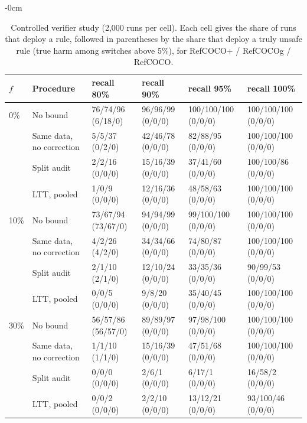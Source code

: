 \begin{table}[H]
\begin{adjustwidth}{-\extralength}{0cm}
\caption{Controlled verifier study (2,000 runs per cell).  Each cell gives the share of
runs that deploy a rule, followed in parentheses by the share that deploy a truly unsafe
rule (true harm among switches above 5\%), for RefCOCO+ / RefCOCOg / RefCOCO.\label{tab:controlled}}
\centering
\small
\setlength{\tabcolsep}{3pt}
\begin{tabular}{@{}llllll@{}}
\toprule
$f$ & Procedure & recall 80\% & recall 90\% & recall 95\% & recall 100\% \\
\midrule
0\% & No bound & 76/74/96 (6/18/0) & 96/96/99 (0/0/0) & 100/100/100 (0/0/0) & 100/100/100 (0/0/0) \\
 & Same data, no correction & 5/5/37 (0/2/0) & 42/46/78 (0/0/0) & 82/88/95 (0/0/0) & 100/100/100 (0/0/0) \\
 & Split audit & 2/2/16 (0/0/0) & 15/16/39 (0/0/0) & 37/41/60 (0/0/0) & 100/100/86 (0/0/0) \\
 & LTT, pooled & 1/0/9 (0/0/0) & 12/16/36 (0/0/0) & 48/58/63 (0/0/0) & 100/100/100 (0/0/0) \\
\midrule
10\% & No bound & 73/67/94 (73/67/0) & 94/94/99 (0/0/0) & 99/100/100 (0/0/0) & 100/100/100 (0/0/0) \\
 & Same data, no correction & 4/2/26 (4/2/0) & 34/34/66 (0/0/0) & 74/80/87 (0/0/0) & 100/100/100 (0/0/0) \\
 & Split audit & 2/1/10 (2/1/0) & 12/10/24 (0/0/0) & 33/35/36 (0/0/0) & 90/99/53 (0/0/0) \\
 & LTT, pooled & 0/0/5 (0/0/0) & 9/8/20 (0/0/0) & 35/40/45 (0/0/0) & 100/100/100 (0/0/0) \\
\midrule
30\% & No bound & 56/57/86 (56/57/0) & 89/89/97 (0/0/0) & 97/98/100 (0/0/0) & 100/100/100 (0/0/0) \\
 & Same data, no correction & 1/1/10 (1/1/0) & 15/16/39 (0/0/0) & 47/51/68 (0/0/0) & 100/100/100 (0/0/0) \\
 & Split audit & 0/0/0 (0/0/0) & 2/6/1 (0/0/0) & 6/17/1 (0/0/0) & 16/58/2 (0/0/0) \\
 & LTT, pooled & 0/0/2 (0/0/0) & 2/2/10 (0/0/0) & 13/12/21 (0/0/0) & 93/100/46 (0/0/0) \\
\bottomrule
\end{tabular}
\end{adjustwidth}
\end{table}
